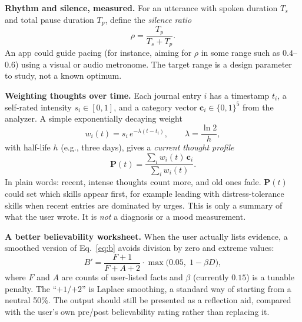 \documentclass[11pt]{article}
\begin{document}
\textbf{Rhythm and silence, measured.} For an utterance with spoken duration $T_s$ and total pause duration $T_p$, define the \emph{silence ratio}
\[
\rho = \frac{T_p}{T_s + T_p}.
\]
An app could guide pacing (for instance, aiming for $\rho$ in some range such as $0.4$--$0.6$) using a visual or audio metronome. The target range is a design parameter to study, not a known optimum.

\textbf{Weighting thoughts over time.} Each journal entry $i$ has a timestamp $t_i$, a self-rated intensity $s_i\in[0,1]$, and a category vector $\mathbf{c}_i \in \{0,1\}^5$ from the analyzer. A simple exponentially decaying weight
\[
w_i(t) = s_i\, e^{-\lambda (t - t_i)}, \qquad \lambda = \frac{\ln 2}{h},
\]
with half-life $h$ (e.g., three days), gives a \emph{current thought profile}
\[
\mathbf{P}(t) = \frac{\sum_i w_i(t)\,\mathbf{c}_i}{\sum_i w_i(t)}.
\]
In plain words: recent, intense thoughts count more, and old ones fade. $\mathbf{P}(t)$ could set which skills appear first, for example leading with distress-tolerance skills when recent entries are dominated by urges. This is only a summary of what the user wrote. It is \emph{not} a diagnosis or a mood measurement.

\textbf{A better believability worksheet.} When the user actually lists evidence, a smoothed version of Eq.~\eqref{eq:b} avoids division by zero and extreme values:
\[
B' = \frac{F+1}{F+A+2}\cdot \max\bigl(0.05,\; 1-\beta D\bigr),
\]
where $F$ and $A$ are counts of user-listed facts and $\beta$ (currently $0.15$) is a tunable penalty. The ``$+1$/$+2$'' is Laplace smoothing, a standard way of starting from a neutral 50\%. The output should still be presented as a reflection aid, compared with the user's own pre/post believability rating rather than replacing it.
\end{document}
